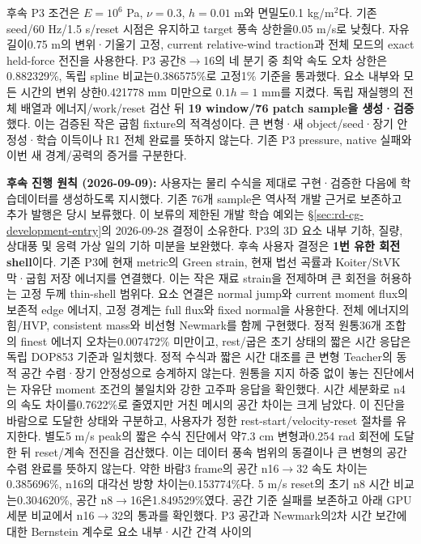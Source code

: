 \documentclass[11pt]{article}
\begin{document}
후속 P3 조건은 \(E=10^6\) Pa, \(\nu=0.3\), \(h=0.01\) m와 면밀도0.1 kg/m$^2$다.
기존 seed/60 Hz/1.5 s/reset 시점은 유지하고 target 풍속 상한을0.05 m/s로 낮췄다.
자유 길이0.75 m의 변위·기울기 고정, current relative-wind traction과 전체 모드의 exact held-force 전진을 사용한다.
P3 공간8$\to$16의 네 분기 중 최악 속도 오차 상한은0.882329\%, 독립 spline 비교는0.386575\%로
고정1\% 기준을 통과했다. 요소 내부와 모든 시간의 변위 상한0.421778 mm 미만으로 \(0.1h=1\) mm를 지켰다.
독립 재실행의 전체 배열과 에너지/work/reset 검산 뒤 \textbf{19 window/76 patch sample을 생성·검증}했다.
이는 검증된 작은 굽힘 fixture의 적격성이다. 큰 변형·새 object/seed·장기 안정성·학습 이득이나
R1 전체 완료를 뜻하지 않는다. 기존 P3 pressure, native 실패와 이번 새 경계/공력의 증거를 구분한다.

\textbf{후속 진행 원칙 (2026-09-09):} 사용자는 물리 수식을 제대로 구현·검증한 다음에
학습데이터를 생성하도록 지시했다. 기존 76개 sample은 역사적 개발 근거로 보존하고 추가 발행은
당시 보류했다. 이 보류의 제한된 개발 학습 예외는 \S\ref{sec:rd-cg-development-entry}의
2026-09-28 결정이 소유한다. P3의 3D 요소 내부 기하, 질량, 상대풍 및 응력 가상 일의 기하 미분을 보완했다.
후속 사용자 결정은 \textbf{1번 유한 회전 shell}이다. 기존 P3에 현재 metric의 Green strain,
현재 법선 곡률과 Koiter/StVK 막·굽힘 저장 에너지를 연결했다. 이는 작은 재료 strain을 전제하며
큰 회전을 허용하는 고정 두께 thin-shell 범위다. 요소 연결은 normal jump와 current moment flux의
보존적 edge 에너지, 고정 경계는 full flux와 fixed normal을 사용한다.
전체 에너지의 힘/HVP, consistent mass와 비선형 Newmark를 함께 구현했다.
정적 원통36개 조합의 finest 에너지 오차는0.007472\% 미만이고,
rest/굽은 초기 상태의 짧은 시간 응답은 독립 DOP853 기준과 일치했다.
정적 수식과 짧은 시간 대조를 큰 변형 Teacher의 동적 공간 수렴·장기 안정성으로 승계하지 않는다.
원통을 지지 하중 없이 놓는 진단에서는 자유단 moment 조건의 불일치와 강한 고주파 응답을 확인했다.
시간 세분화로 n4의 속도 차이를0.7622\%로 줄였지만 거친 메시의 공간 차이는 크게 남았다.
이 진단을 바람으로 도달한 상태와 구분하고, 사용자가 정한 rest-start/velocity-reset 절차를 유지한다.
별도5 m/s peak의 짧은 수식 진단에서 약7.3 cm 변형과0.254 rad 회전에 도달한 뒤 reset/계속 전진을 검산했다.
이는 데이터 풍속 범위의 동결이나 큰 변형의 공간 수렴 완료를 뜻하지 않는다.
약한 바람3 frame의 공간 n16$\to$32 속도 차이는0.385696\%, n16의 대각선 방향 차이는0.153774\%다.
5 m/s reset의 초기 n8 시간 비교는0.304620\%, 공간 n8$\to$16은1.849529\%였다.
공간 기준 실패를 보존하고 아래 GPU 세분 비교에서 n16$\to$32의 통과를 확인했다.
P3 공간과 Newmark의2차 시간 보간에 대한 Bernstein 계수로 요소 내부·시간 간격 사이의
\end{document}
